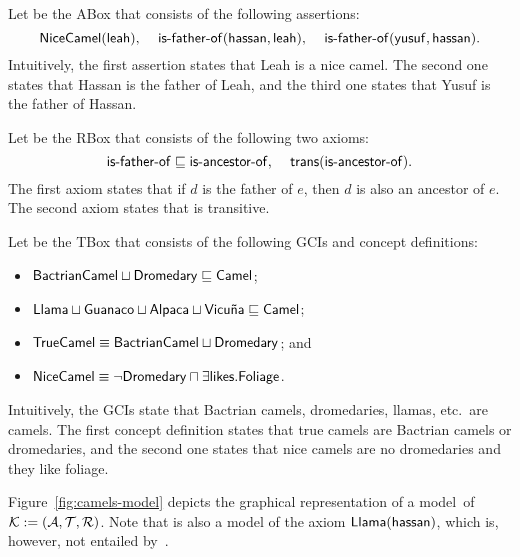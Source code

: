 \begin{example}\label{ex:camels}
    Let \Amc be the ABox that consists of the following assertions:
    \[\NiceCamel(\leah)\text{, }\quad
        \isFatherOf(\hassan,\leah)\text{, }\quad
        \isFatherOf(\yusuf,\hassan).\]
    Intuitively, the first assertion states that Leah is a nice camel.  The
    second one states that Hassan is the father of Leah, and the third one
    states that Yusuf is the father of Hassan.

    Let \Rmc be the RBox that consists of the following two axioms:
    \[\isFatherOf\sqsubseteq\isAncestorOf\text{, }\quad
        \trans(\isAncestorOf).\]
    The first axiom states that if $d$ is the father of $e$, then $d$ is also an
    ancestor of $e$.  The second axiom states that \isAncestorOf is transitive.

    Let \Tmc be the TBox that consists of the following GCIs and concept
    definitions:
    \begin{itemize}
        \item $\BactrianCamel\sqcup\Dromedary\sqsubseteq\Camel$;
        \item $\Llama\sqcup\Guanaco\sqcup\Alpaca\sqcup\Vicuna\sqsubseteq\Camel$;
        \item $\TrueCamel\equiv\BactrianCamel\sqcup\Dromedary$; and
        \item $\NiceCamel\equiv\lnot\Dromedary\sqcap\exists\likes.\Foliage$.
    \end{itemize}
    Intuitively, the GCIs state that Bactrian camels, dromedaries, llamas, etc.\
    are camels.  The first concept definition states that true camels are
    Bactrian camels or dromedaries, and the second one states that nice camels
    are no dromedaries and they like foliage.

    Figure~\ref{fig:camels-model} depicts the graphical representation of a
    model~\Imc of $\Kmc:=(\Amc,\Tmc,\Rmc)$.
    Note that \Imc is also a model of the axiom $\Llama(\hassan)$, which
    is, however, not entailed by~\Kmc.
\end{example}

